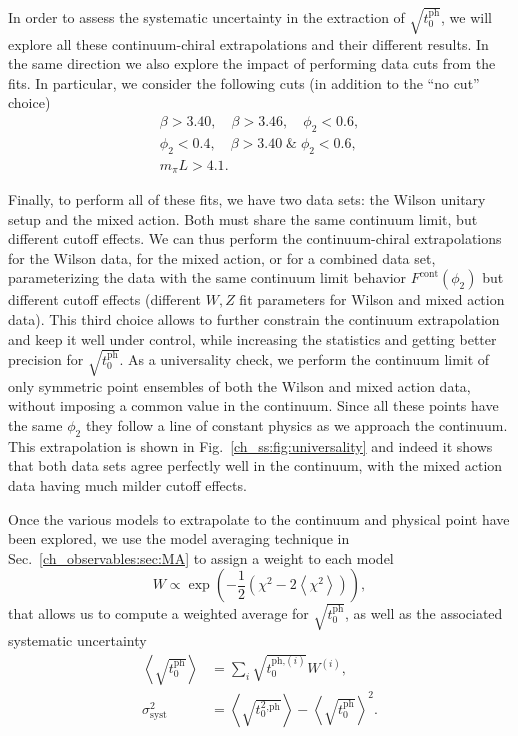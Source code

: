 In order to assess the systematic uncertainty in the extraction of $\sqrt{t_0^{\textrm{ph}}}$, we will explore all these continuum-chiral extrapolations and their different results. In the same direction we also explore the impact of performing data cuts from the fits. In particular, we consider the following cuts (in addition to the ``no cut'' choice)
\begin{gather}
\beta>3.40, \quad
\beta>3.46, \quad
\phi_2<0.6, \\
\phi_2<0.4, \quad
\beta>3.40\;\&\;\phi_2<0.6, \\
m_{\pi}L>4.1.
\end{gather}

Finally, to perform all of these fits, we have two data sets: the Wilson unitary setup and the mixed action. Both must share the same continuum limit, but different cutoff effects. We can thus perform the continuum-chiral extrapolations for the Wilson data, for the mixed action, or for a combined data set, parameterizing the data with the same continuum limit behavior $F^{\textrm{cont}}(\phi_2)$ but different cutoff effects (different $W,Z$ fit parameters for Wilson and mixed action data). This third choice allows to further constrain the continuum extrapolation and keep it well under control, while increasing the statistics and getting better precision for $\sqrt{t_0^{\textrm{ph}}}$. As a universality check, we perform the continuum limit of only symmetric point ensembles of both the Wilson and mixed action data, without imposing a common value in the continuum. Since all these points have the same $\phi_2$ they follow a line of constant physics as we approach the continuum. This extrapolation is shown in Fig.~\ref{ch_ss:fig:universality} and indeed it shows that both data sets agree perfectly well in the continuum, with the mixed action data having much milder cutoff effects.

Once the various models to extrapolate to the continuum and physical point have been explored, we use the model averaging technique in Sec.~\ref{ch_observables:sec:MA} to assign a weight to each model 
\begin{equation}
\label{ch_ss:eq:W}
W\propto\exp\left(-\frac{1}{2}\left(\chi^2-2\left<\chi^2\right>\right)\right),
\end{equation}
that allows us to compute a weighted average for $\sqrt{t_0^{\textrm{ph}}}$, as well as the associated systematic uncertainty
\begin{align}
\left<\sqrt{t_0^{\textrm{ph}}}\right>&=\sum_i\sqrt{t_0^{\textrm{ph,}(i)}}W^{(i)},\\
\sigma^2_{\textrm{syst}}&=\left<\sqrt{t_0^2^{\textrm{,ph}}}\right>-\left<\sqrt{t_0^{\textrm{ph}}}\right>^2.
\end{align}

